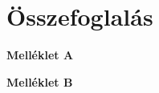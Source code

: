 \documentclass[12pt,a4paper,oneside]{report}
\begin{document}
\chapter{Összefoglalás}



\footnotesize  %


\newpage

\appendix
{}
\begin{center}
    \Large\textbf{Melléklet A}
\end{center}
%
\newpage

\begin{center}
    \Large\textbf{Melléklet B}
\end{center}
\end{document}
